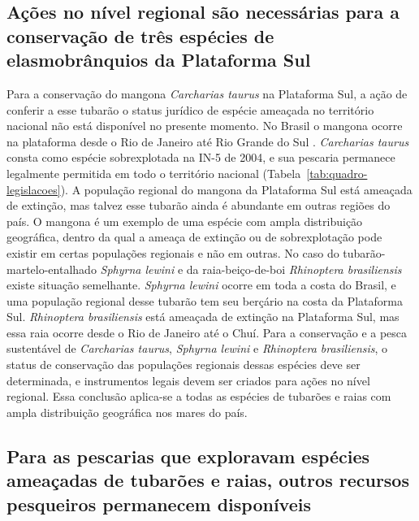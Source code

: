 \documentclass[a4paper,11pt,twoside,showtrims,onecolumn,openright,final]{memoir}
\begin{document}


\subsection*{Ações no nível regional são necessárias para a conservação 
          de três espécies de elasmobrânquios da Plataforma Sul}
	  
Para a conservação do mangona \emph{Carcharias taurus} na Plataforma Sul, 
a ação de conferir a esse tubarão o status jurídico de espécie ameaçada 
no território nacional não está disponível no presente momento. 
No Brasil o mangona ocorre  na plataforma desde o Rio de Janeiro 
até Rio Grande do Sul \citep{soto2001a}. %
\emph{Carcharias taurus} consta como espécie sobrexplotada na IN-5 de 2004,
e sua pescaria permanece legalmente permitida em todo o território nacional (Tabela~\ref{tab:quadro-legislacoes}).
A população regional do mangona da Plataforma Sul está ameaçada de extinção, mas talvez 
esse tubarão ainda é abundante em outras regiões do país. O mangona  é um exemplo de uma 
espécie com ampla distribuição geográfica, dentro da qual a ameaça de extinção ou de 
sobrexplotação pode existir em certas populações regionais e não em outras.
No caso do tubarão-martelo-entalhado \emph{Sphyrna lewini} e 
da raia-beiço-de-boi \emph{Rhinoptera brasiliensis} existe situação semelhante.
\emph{Sphyrna lewini} ocorre em toda a costa do Brasil, e uma população regional 
desse tubarão tem seu berçário na costa da Plataforma Sul. \emph{Rhinoptera brasiliensis} 
está ameaçada de extinção na Plataforma Sul, mas essa raia ocorre desde o Rio de Janeiro até o Chuí. 
Para a conservação e a pesca sustentável de \emph{Carcharias taurus}, \emph{Sphyrna lewini} e  
\emph{Rhinoptera brasiliensis}, o status de conservação das populações regionais dessas espécies 
deve ser determinada, e instrumentos legais devem ser criados para ações no nível regional. 
Essa conclusão aplica-se a todas as espécies de tubarões e raias com ampla distribuição 
geográfica nos mares do país.

\subsection*{Para as pescarias que exploravam espécies ameaçadas de tubarões e raias, 
             outros recursos pesqueiros permanecem disponíveis}
	  
\end{document}
